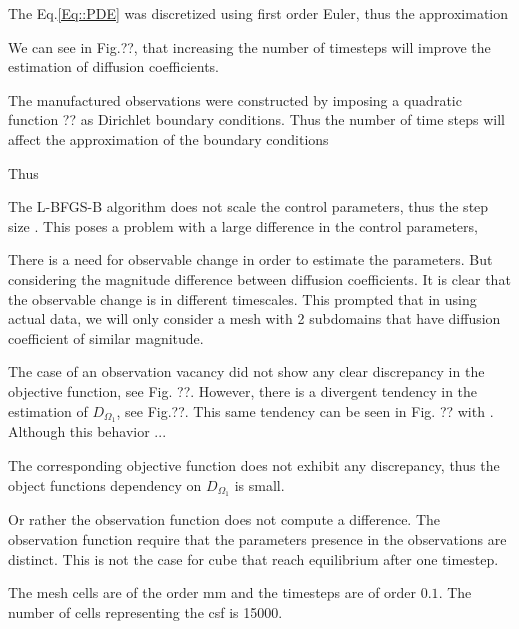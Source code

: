 \documentclass[11pt,a4paper]{article}
\begin{document}
 
The Eq.\ref{Eq::PDE} was discretized using first order Euler, thus the approximation  




We can see in Fig.??, that increasing the number of timesteps will improve the estimation of diffusion coefficients. 


The manufactured observations were constructed by imposing a quadratic function ?? as Dirichlet boundary conditions. Thus the number of time steps will affect the approximation of the boundary conditions


Thus 

The L-BFGS-B algorithm does not scale the control parameters, thus the step size . This poses a problem with a large difference in the control parameters, 







There is a need for observable change in order to estimate the parameters. But considering the magnitude difference between diffusion coefficients. It is clear that the observable change is in different timescales. This prompted that in using actual data, we will only consider a mesh with 2 subdomains that have diffusion coefficient of similar magnitude.   



The case of an observation vacancy did not show any clear discrepancy in the objective function, see Fig. ??. However, there is a divergent tendency in the estimation of $D_{\Omega_1}$, see Fig.??. This same tendency can be seen in Fig. ?? with . Although this behavior  ... 


The corresponding objective function does not exhibit any discrepancy, thus the object functions dependency on $D_{\Omega_1}$ is small. 

Or rather the observation function does not compute a difference. The observation function require that the parameters presence in the observations are distinct. This is not the case for cube that reach equilibrium after one timestep. 

The mesh cells are of the order $\mathrm{mm}$ and the timesteps are of order $0.1$. The number of cells representing the csf is 15000.    
  






\end{document}
